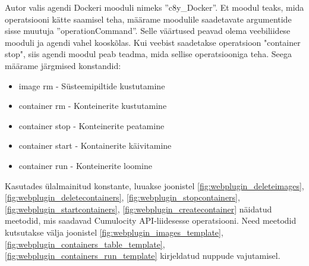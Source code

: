\documentclass[12pt]{article}
\begin{document}
 \FloatBarrier

 Autor valis agendi Dockeri mooduli nimeks ''c8y\_Docker''. Et moodul teaks,
 mida operatsiooni kätte saamisel teha, määrame moodulile saadetavate argumentide
 sisse muutuja ''operationCommand''. Selle väärtused peavad olema veebiliidese mooduli ja
 agendi vahel kooskõlas. Kui veebist saadetakse operatsioon "container stop", siis agendi moodul
 peab teadma, mida sellise operatsiooniga teha. Seega määrame
 järgmised konstandid:

 \begin{itemize}
 \item image rm - Süsteemipiltide kustutamine
 \item container rm - Konteinerite kustutamine
 \item container stop - Konteinerite peatamine
 \item container start - Kontainerite käivitamine
 \item container run - Konteinerite loomine
 \end{itemize}


 Kasutades ülalmainitud konstante, luuakse joonistel
 \ref{fig:webplugin_deleteimages},
 \ref{fig:webplugin_deletecontainers},
 \ref{fig:webplugin_stopcontainers},
 \ref{fig:webplugin_startcontainers},
 \ref{fig:webplugin_createcontainer}
 näidatud meetodid, mis saadavad Cumulocity API-liidesesse operatsiooni.
 Need meetodid kutsutakse välja joonistel
 \ref{fig:webplugin_images_template},
 \ref{fig:webplugin_containers_table_template},
 \ref{fig:webplugin_containers_run_template}
 kirjeldatud nuppude vajutamisel.
\end{document}

